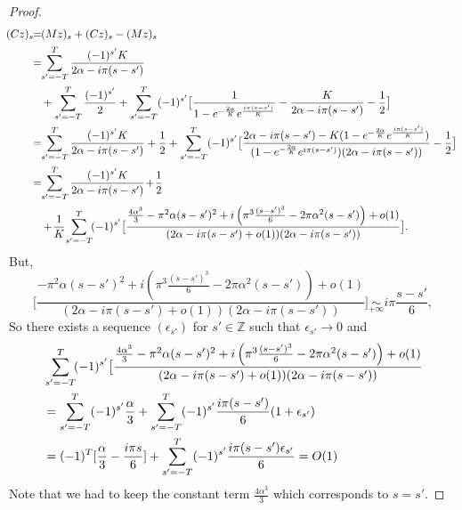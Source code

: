 \begin{proof}
\begin{align}
    \!\!(Cz)_s \!\! &= \!\!(Mz)_s + (Cz)_s - (Mz)_s\notag\\
    &=\!\!\sum_{s'=-T}^T\frac{(-1)^{s'}K}{2\alpha - i\pi(s-s')}\notag\\
    &\quad + \sum_{s'=-T}^T\frac{(-1)^{s'}}{2} + \sum_{s'=-T}^T(-1)^{s'}\big[\frac{1}{1-e^{-\frac{2\alpha}{K}}e^{\frac{i\pi(s-s')}{K}}}-\frac{K}{2\alpha - i\pi(s-s')}-\frac{1}{2}\big]\notag\\
    &=\!\!\sum_{s'=-T}^T\frac{(-1)^{s'}K}{2\alpha - i\pi(s-s')}  + \frac{1}{2} + \sum_{s'=-T}^T(-1)^{s'}\big[\frac{2\alpha-i\pi(s-s')-K(1-e^{-\frac{2\alpha}{K}}e^{\frac{i\pi(s-s')}{K}})}{(1-e^{-\frac{2\alpha}{K}}e^{i\pi(s-s')})(2\alpha - i\pi(s-s'))} - \frac{1}{2}\big]\notag\\
    &=\!\!\sum_{s'=-T}^T\frac{(-1)^{s'}K}{2\alpha - i\pi(s-s')}  \!+\! \frac{1}{2}\! \notag\\
    &\quad +\!\frac{1}{K}\!\sum_{s'=-T}^T \! (-1)^{s'}\big[\frac{\frac{4\alpha^3}{3} - \pi^2 \alpha (s-s')^2 + i \left(\pi^3\frac{(s-s')^3}{6} - 2\pi \alpha^2 (s-s') \right) + o(1)}{(2\alpha-i\pi(s-s')+o(1))(2\alpha-i\pi(s-s'))}\big].\label{Cz approx}
\end{align}
But, 
\[
\bigg[\frac{- \pi^2 \alpha (s-s')^2 + i \left(\pi^3\frac{(s-s')^3}{6} - 2\pi \alpha^2 (s-s') \right) + o(1)}{(2\alpha-i\pi(s-s')+o(1))(2\alpha-i\pi(s-s'))}\bigg] \underset{+\infty}{\sim}i\pi\frac{s-s'}{6},
\]
So there exists a sequence $(\epsilon_{s'})$ for $s'\in\mathbb{Z}$ such that $\epsilon_{s'}\rightarrow 0$ and 
\begin{align}
    &\sum_{s'=-T}^T \! (-1)^{s'}\big[\frac{\frac{4\alpha^3}{3} - \pi^2 \alpha (s-s')^2 + i \left(\pi^3\frac{(s-s')^3}{6} - 2\pi \alpha^2 (s-s') \right) + o(1)}{(2\alpha-i\pi(s-s')+o(1))(2\alpha-i\pi(s-s'))} \notag
    \\&=\sum_{s'=-T}^T(-1)^{s'}\frac{\alpha}{3} +\sum_{s'=-T}^T(-1)^{s'}\frac{i\pi(s-s')}{6}(1+\epsilon_{s'})\notag\\
    &\label{eq:equivalent partial sums 0(1)}=(-1)^T[\frac{\alpha}{3}-\frac{i\pi s}{6}] +\sum_{s'=-T}^T(-1)^{s'}\frac{i\pi(s-s')\epsilon_{s'}}{6} = O(1)
\end{align}
Note that we had to keep the constant term $\frac{4\alpha^3}{3}$ which corresponds to $s=s'$.


\end{proof}
